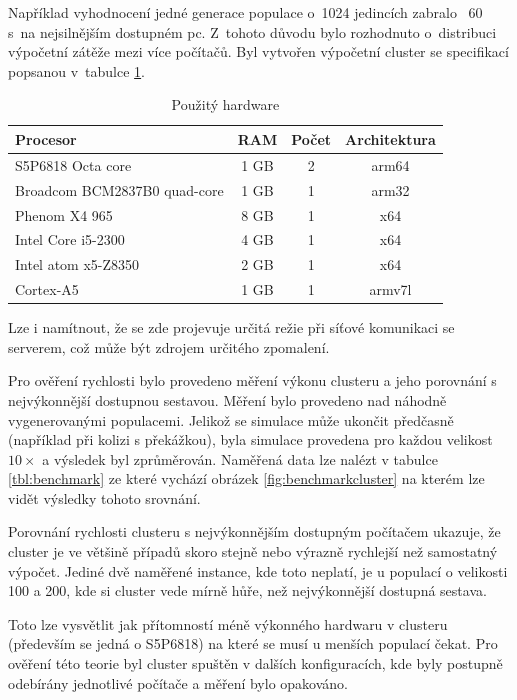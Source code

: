 Například vyhodnocení jedné generace populace o~1024 jedincích zabralo ~60 s~na nejsilnějším dostupném pc. Z~tohoto důvodu bylo rozhodnuto o~distribuci výpočetní zátěže mezi více počítačů. Byl vytvořen výpočetní cluster se specifikací popsanou v~tabulce \ref{table:hw_table}.
\begin{table}[h!]
	\centering
	\begin{tabular}{|l|c|c|c|}
		\hline 
		Procesor & RAM & Počet & Architektura\\ 
		\hline 
		S5P6818 Octa core & 1 GB & 2 & arm64 \\ 
		\hline 
		Broadcom BCM2837B0 quad-core & 1 GB & 1 & arm32 \\ 
		\hline 
		Phenom X4 965 & 8 GB & 1 & x64 \\ 
		\hline
		Intel Core i5-2300 & 4 GB & 1 & x64 \\ 
		\hline 
		Intel atom x5-Z8350 & 2 GB & 1 & x64 \\ 
		\hline
		Cortex-A5 & 1 GB & 1 & armv7l \\
		\hline
	\end{tabular} 
	\caption{Použitý hardware}
	\label{table:hw_table}
	
\end{table}

Lze i namítnout, že se zde projevuje určitá režie při síťové komunikaci se serverem, což může být zdrojem určitého zpomalení.

Pro ověření rychlosti bylo provedeno měření výkonu clusteru a jeho porovnání s nejvýkonnější dostupnou sestavou. Měření bylo provedeno nad náhodně vygenerovanými populacemi. Jelikož se simulace může ukončit předčasně (například při kolizi s překážkou), byla simulace provedena pro každou velikost $10\times$ a výsledek byl zprůměrován. Naměřená data lze nalézt v tabulce \ref{tbl:benchmark} ze které vychází obrázek \ref{fig:benchmarkcluster} na kterém lze vidět výsledky tohoto srovnání. 

Porovnání rychlosti clusteru s nejvýkonnějším dostupným počítačem ukazuje, že cluster je ve většině případů skoro stejně nebo  výrazně rychlejší než samostatný výpočet. Jediné dvě naměřené instance, kde toto neplatí, je u populací o velikosti 100 a 200, kde si cluster vede mírně hůře, než nejvýkonnější dostupná sestava.

Toto lze vysvětlit jak přítomností méně výkonného hardwaru v clusteru (především se jedná o S5P6818) na které se musí u menších populací čekat. Pro ověření této teorie byl cluster spuštěn v dalších konfiguracích, kde byly postupně odebírány jednotlivé počítače a měření bylo opakováno. 

